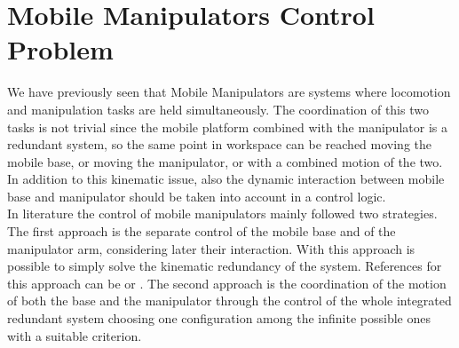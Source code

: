 
\chapter{Mobile Manipulators Control Problem}
\label{chapter4}
We have previously seen that Mobile Manipulators are systems where locomotion and manipulation tasks are held simultaneously. The coordination of this two tasks is not trivial since the mobile platform combined with the manipulator is a redundant system, so the same point in workspace can be reached moving the mobile base, or moving the manipulator, or with a combined motion of the two. In addition to this kinematic issue, also the dynamic interaction between mobile base and manipulator should be taken into account in a control logic. \\
In literature the control of mobile manipulators mainly followed two strategies. The first approach is the separate control of the mobile base and of the manipulator arm, considering later their interaction. With this approach is possible to simply solve the kinematic redundancy of the system. References for this approach can be \cite{liulewis} or \cite{chung1998interaction}. The second approach is the coordination of the motion of both the base and the manipulator through the control of the whole integrated redundant system choosing one configuration among the infinite possible ones with a suitable criterion.\\
